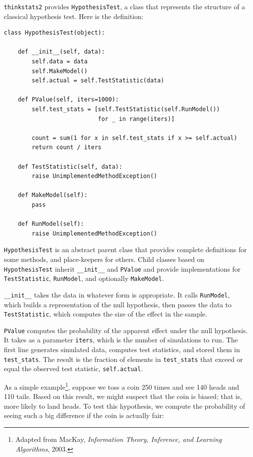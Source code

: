 \documentclass[12pt]{book}
\begin{document}
{\tt thinkstats2} provides {\tt HypothesisTest}, a
class that represents the structure of a classical hypothesis
test.  Here is the definition:

\begin{verbatim}
class HypothesisTest(object):

    def __init__(self, data):
        self.data = data
        self.MakeModel()
        self.actual = self.TestStatistic(data)

    def PValue(self, iters=1000):
        self.test_stats = [self.TestStatistic(self.RunModel()) 
                           for _ in range(iters)]

        count = sum(1 for x in self.test_stats if x >= self.actual)
        return count / iters

    def TestStatistic(self, data):
        raise UnimplementedMethodException()

    def MakeModel(self):
        pass

    def RunModel(self):
        raise UnimplementedMethodException()
\end{verbatim}

{\tt HypothesisTest} is an abstract parent class that provides
complete definitions for some methods, and place-keepers for others.
Child classes based on {\tt HypothesisTest} inherit \verb"__init__"
and {\tt PValue} and provide implementations for {\tt TestStatistic},
{\tt RunModel}, and optionally {\tt MakeModel}.

\verb"__init__" takes the data in whatever form is appropriate.  It
calls {\tt RunModel}, which builds a representation of the null
hypothesis, then passes the data to {\tt TestStatistic}, which
computes the size of the effect in the sample.

{\tt PValue} computes the probability of the apparent effect under
the null hypothesis.  It takes as a parameter {\tt iters}, which is
the number of simulations to run.  The first line generates simulated
data, computes test statistics, and stored them in
\verb"test_stats".
The result is
the fraction of elements in \verb"test_stats" that
exceed or equal the observed test statistic, {\tt self.actual}.

As a simple example\footnote{Adapted from MacKay, {\it Information
    Theory, Inference, and Learning Algorithms}, 2003.}, suppose we
toss a coin 250 times and see 140 heads and 110 tails.  Based on this
result, we might suspect that the coin is biased; that is, more likely
to land heads.  To test this hypothesis, we compute the
probability of seeing such a big difference if the coin is actually
fair:
\end{document}
